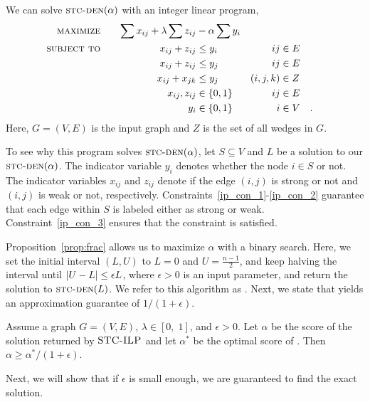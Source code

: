 We can solve $\textsc{stc-den}(\alpha)$ with an integer linear program,
\begin{alignat}{3}
\textsc{maximize}&\quad&\sum x_{ij} + \lambda \sum z_{ij}  & - \alpha \sum y_i \label{obj} \textstyle  & 
	\\  
	\textsc{subject to}&& x_{ij} + z_{ij} & \leq y_i &  ij & \in E \label{ip_con_1}\\
	&&x_{ij} + z_{ij} & \leq y_j &  ij & \in E \label{ip_con_2}\\
        &&x_{ij}  + x_{jk} & \leq y_j &  (i, j, k) & \in Z \label{ip_con_3}\\
        &&x_{ij}, z_{ij} & \in \{0,1\} &  ij & \in E \label{var_x_z}\\
        &&y_{i} & \in \{0,1\} &  i & \in V \label{var_v} \quad.
\end{alignat}
Here, $G = (V, E)$ is the input graph and $Z$ is the set of all wedges in $G$.

To see why this program solves $\textsc{stc-den}(\alpha)$,
let $S \subseteq V$ and $L$ be a solution to our $\textsc{stc-den}(\alpha)$. The indicator variable $y_i$ denotes whether the node $i \in S$ or not. The indicator variables $x_{ij}$ and $z_{ij}$ denote if the edge $(i,j)$ is strong or not and $(i,j) $ is weak or not, respectively.
Constraints~\ref{ip_con_1}-\ref{ip_con_2} guarantee that each edge within $S$ is labeled either as strong or weak. Constraint~\ref{ip_con_3} ensures that the \stc constraint is satisfied.  

Proposition~\ref{prop:frac}
allows us to maximize $\alpha$
with a binary search. Here, we set the initial interval $(L, U)$ to $L = 0$ and $U = \frac{n - 1}{2}$, and keep halving the interval until ${\left| U - L\right|} \leq  \epsilon L$, where $\epsilon > 0$  is an input parameter, and return the solution to $\textsc{stc-den}(L)$. We refer to this algorithm as \algip.
Next, we state that \algip yields an approximation guarantee of  $1/(1+\epsilon)$.

\begin{proposition}
Assume a graph $G = (V, E)$, $\lambda \in [0,\;1]$, and $\epsilon > 0$. 
Let $\alpha$ be the score of the solution returned by $\textsc{STC-ILP}$ and let $\alpha^*$ be the optimal score of \prbstrwk. Then $\alpha \geq \alpha^*/(1 + \epsilon)$.
\label{prop:opt-ip-approx}
\end{proposition}


Next, we will show that if $\epsilon$ is small enough, we are guaranteed to find the exact solution.

